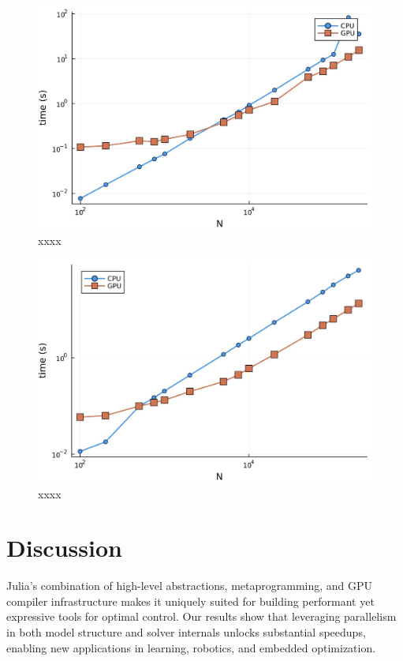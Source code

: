  \begin{figure}
\includegraphics[width=.45\textwidth]{goddard-h100.jpg}
\caption{xxxx}
\label{fig3}
\end{figure}
 
\begin{figure}
\includegraphics[width=.45\textwidth]{quadrotor-h100.jpg}
\caption{xxxx}
\label{fig4}
\end{figure}


\section{Discussion}
Julia’s combination of high-level abstractions, metaprogramming, and GPU compiler infrastructure makes it uniquely suited for building performant yet expressive tools for optimal control.  
Our results show that leveraging parallelism in both model structure and solver internals unlocks substantial speedups, enabling new applications in learning, robotics, and embedded optimization.


